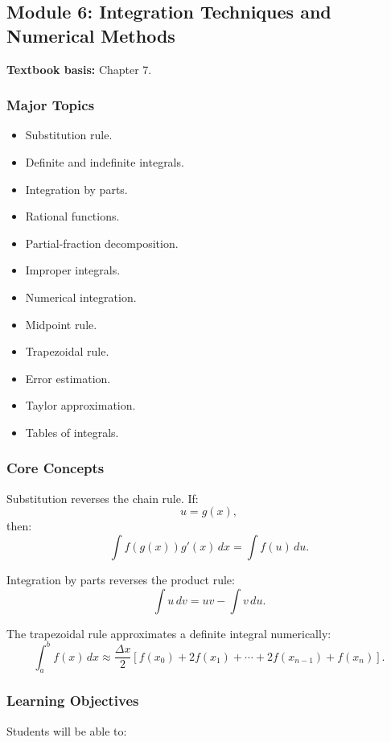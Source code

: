 \documentclass[11pt]{article}
\begin{document}
\subsection{Module 6: Integration Techniques and Numerical Methods}

\textbf{Textbook basis:} Chapter 7.

\subsubsection*{Major Topics}

\begin{itemize}
    \item Substitution rule.
    \item Definite and indefinite integrals.
    \item Integration by parts.
    \item Rational functions.
    \item Partial-fraction decomposition.
    \item Improper integrals.
    \item Numerical integration.
    \item Midpoint rule.
    \item Trapezoidal rule.
    \item Error estimation.
    \item Taylor approximation.
    \item Tables of integrals.
\end{itemize}

\subsubsection*{Core Concepts}

Substitution reverses the chain rule. If:
\[
u=g(x),
\]
then:
\[
\int f(g(x))g'(x)\,dx=\int f(u)\,du.
\]

Integration by parts reverses the product rule:
\[
\int u\,dv=uv-\int v\,du.
\]

The trapezoidal rule approximates a definite integral numerically:
\[
\int_a^b f(x)\,dx
\approx
\frac{\Delta x}{2}
\left[
f(x_0)+2f(x_1)+\cdots+2f(x_{n-1})+f(x_n)
\right].
\]

\subsubsection*{Learning Objectives}

Students will be able to:
\end{document}
